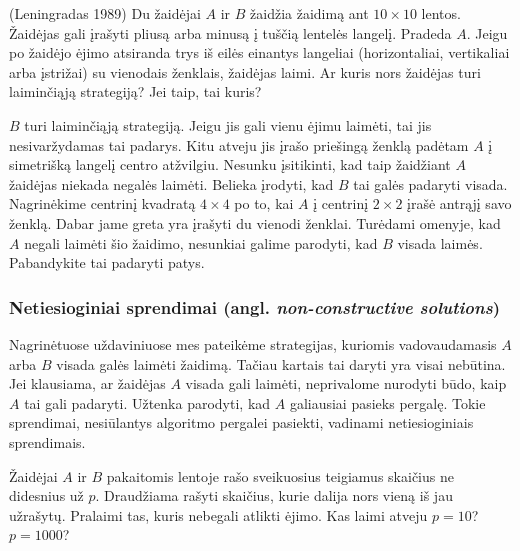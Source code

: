 \begin{pavnr}{(Leningradas 1989)}
  Du žaidėjai $A$ ir $B$ žaidžia žaidimą ant $10\times 10$ lentos. Žaidėjas
  gali įrašyti pliusą arba minusą į tuščią lentelės langelį. Pradeda $A$.
  Jeigu po žaidėjo ėjimo atsiranda trys iš eilės einantys langeliai
  (horizontaliai, vertikaliai arba įstrižai) su vienodais ženklais,
  žaidėjas laimi. Ar kuris nors žaidėjas turi laiminčiąją strategiją? Jei
  taip, tai kuris?
\end{pavnr}

\begin{sprendimas}
  $B$ turi laiminčiąją strategiją. Jeigu jis gali vienu ėjimu laimėti, tai jis
  nesivaržydamas  tai padarys. Kitu atveju jis įrašo priešingą ženklą padėtam
  $A$ į simetrišką langelį centro atžvilgiu. Nesunku įsitikinti, kad taip
  žaidžiant $A$ žaidėjas niekada negalės laimėti. Belieka
  įrodyti, kad $B$ tai galės padaryti visada. Nagrinėkime centrinį kvadratą
  $4\times 4$ po to, kai $A$ į centrinį $2\times 2$ įrašė antrąjį savo
  ženklą. Dabar jame greta yra įrašyti du vienodi ženklai. Turėdami omenyje,
  kad $A$ negali laimėti šio žaidimo, nesunkiai galime parodyti, kad $B$ visada
  laimės. Pabandykite tai padaryti patys.  
\end{sprendimas}

\subsubsection{Netiesioginiai sprendimai (angl. \emph{non-constructive solutions})}

Nagrinėtuose uždaviniuose mes pateikėme strategijas, kuriomis
vadovaudamasis $A$ arba $B$ visada galės laimėti žaidimą. Tačiau kartais tai
daryti yra visai nebūtina. Jei klausiama, ar žaidėjas $A$ visada gali
laimėti, neprivalome nurodyti būdo, kaip $A$ tai gali padaryti. Užtenka
parodyti, kad $A$ galiausiai pasieks pergalę. Tokie sprendimai, nesiūlantys
algoritmo pergalei pasiekti, vadinami netiesioginiais sprendimais. 

\begin{pavnr}
  Žaidėjai $A$ ir $B$ pakaitomis lentoje rašo sveikuosius teigiamus skaičius
  ne didesnius už $p$. Draudžiama rašyti skaičius, kurie dalija nors vieną iš
  jau užrašytų. Pralaimi tas, kuris nebegali atlikti ėjimo. Kas laimi atveju
  $p=10$? $p=1000$?
\end{pavnr}


